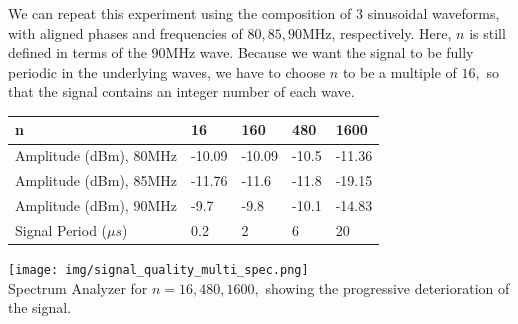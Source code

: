 \documentclass{article}
\begin{document}
    We can repeat this experiment using the composition of 3 sinusoidal waveforms, with aligned phases and frequencies of $80,85,90$MHz, respectively. Here, $n$ is still defined in terms of the 90MHz wave. Because we want the signal to be fully periodic in the underlying waves, we have to choose $n$ to be a multiple of $16,$ so that the signal contains an integer number of each wave.
    \begin{table}[H]
    \centering
    \begin{tabular}{|l|l|l|l|l|}
    \hline
    n & 16 & 160 & 480 & 1600 \\ \hline
    Amplitude (dBm), 80MHz & -10.09 & -10.09 & -10.5 & -11.36 \\ \hline
    Amplitude (dBm), 85MHz & -11.76 & -11.6 & -11.8 & -19.15 \\ \hline
    Amplitude (dBm), 90MHz & -9.7 & -9.8 & -10.1 & -14.83 \\ \hline
    Signal Period ($\mu s$) & 0.2 & 2 & 6 & 20 \\ \hline
    \end{tabular}
    \end{table}
    \begin{mdframed}[backgroundcolor=gray!20, align = center, userdefinedwidth = 6in]
    \texttt{[image: img/signal\_quality\_multi\_spec.png]}\\
    Spectrum Analyzer for $n = 16, 480, 1600,$ showing the progressive deterioration of the signal.
    \end{mdframed}
\end{document}
